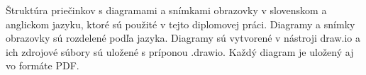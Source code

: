 Štruktúra priečinkov s diagramami a snímkami obrazovky v slovenskom a anglickom jazyku, 
ktoré sú použité v tejto diplomovej práci. Diagramy a snímky obrazovky sú rozdelené podľa jazyka.
Diagramy sú vytvorené v nástroji draw.io a ich zdrojové súbory sú uložené s príponou .drawio. Každý diagram je uložený aj vo formáte PDF.
\newline
{}